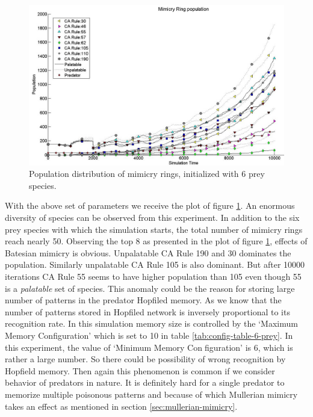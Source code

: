 \begin{figure}[H]
	\centering
	\includegraphics[scale=0.45]{images/simTime10k-6Prey}
	\caption[Population distribution of mimicry rings (6 prey species)]{Population distribution of mimicry rings, initialized with 6 prey species.}
	\label{fig:plot-6-prey}
\end{figure}

With the above set of parameters we receive the plot of figure \ref{fig:plot-6-prey}. An enormous diversity of species can be observed from this experiment. In addition to the six prey species with which the simulation starts, the total number of mimicry rings reach nearly 50. Observing the top 8 as presented in the plot of figure \ref{fig:plot-6-prey}, effects of Batesian mimicry is obvious. Unpalatable CA Rule 190 and 30 dominates the population. Similarly unpalatable CA Rule 105 is also dominant. But after 10000 iterations CA Rule 55 seems to have higher population than 105 even though 55 is a \textsl{palatable} set of species. This anomaly could be the reason for storing large number of patterns in the predator Hopfiled memory. As we know that the number of patterns stored in Hopfiled network is inversely proportional to its recognition rate. In this simulation memory size is controlled by the `Maximum Memory Configuration' which is set to 10 in table \ref{tab:config-table-6-prey}. In this experiment, the value of `Minimum Memory Configuration' is 6, which is rather a large number. So there could be possibility of wrong recognition by Hopfield memory. Then again this phenomenon is common if we consider behavior of predators in nature. It is definitely hard for a single predator to memorize multiple poisonous patterns and because of which Mullerian mimicry takes an effect as mentioned in section \ref{sec:mullerian-mimicry}.

